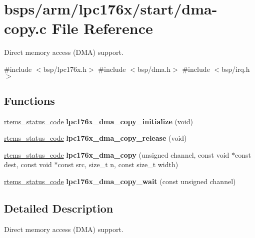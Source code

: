 \hypertarget{lpc176x_2start_2dma-copy_8c}{}\section{bsps/arm/lpc176x/start/dma-\/copy.c File Reference}
\label{lpc176x_2start_2dma-copy_8c}


Direct memory access (D\+MA) support.  


{\ttfamily \#include $<$bsp/lpc176x.\+h$>$}\newline
{\ttfamily \#include $<$bsp/dma.\+h$>$}\newline
{\ttfamily \#include $<$bsp/irq.\+h$>$}\newline
\subsection*{Functions}
\begin{DoxyCompactItemize}
\item 
\mbox{\hyperlink{group__ClassicStatus_ga545d41846817eaba6143d52ee4d9e9fe}{rtems\+\_\+status\+\_\+code}} {\bfseries lpc176x\+\_\+dma\+\_\+copy\+\_\+initialize} (void)
\item 
\mbox{\hyperlink{group__ClassicStatus_ga545d41846817eaba6143d52ee4d9e9fe}{rtems\+\_\+status\+\_\+code}} {\bfseries lpc176x\+\_\+dma\+\_\+copy\+\_\+release} (void)
\item 
\mbox{\hyperlink{group__ClassicStatus_ga545d41846817eaba6143d52ee4d9e9fe}{rtems\+\_\+status\+\_\+code}} {\bfseries lpc176x\+\_\+dma\+\_\+copy} (unsigned channel, const void $\ast$const dest, const void $\ast$const src, size\+\_\+t n, const size\+\_\+t width)
\item 
\mbox{\hyperlink{group__ClassicStatus_ga545d41846817eaba6143d52ee4d9e9fe}{rtems\+\_\+status\+\_\+code}} {\bfseries lpc176x\+\_\+dma\+\_\+copy\+\_\+wait} (const unsigned channel)
\end{DoxyCompactItemize}


\subsection{Detailed Description}
Direct memory access (D\+MA) support. 

